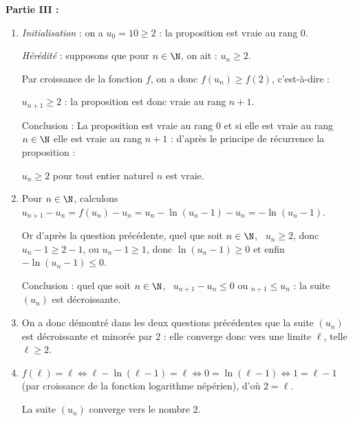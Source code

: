 \bigskip

\textbf{Partie III :}

\medskip

\begin{enumerate}
\item 
\emph{Initialisation} : on a $u_0 = 10 \geqslant 2$
 : la proposition est vraie au rang $0$.

\emph{Hérédité} : supposons que pour $n \in \N$, on ait : $u_n \geqslant 2$.

Par croissance de la fonction $f$, on a donc $f\left(u_n\right) \geqslant f(2)$, c'est-à-dire :

$u_{n+1} \geqslant 2$ : la proposition est donc vraie au rang $n + 1$.

Conclusion : La proposition est vraie au rang $0$ et si elle est vraie au rang $n \in \N$ elle est vraie au rang $n + 1$ : d'après le principe de récurrence la proposition :

\og $u_n \geqslant  2$ pour tout entier naturel $n$\fg{} est vraie.
 \item 
Pour $n \in \N$, calculons $u_{n+1} - u_n  = f\left(u_n \right) - u_n = u_n - \ln \left(u_n - 1 \right) - u_n = - \ln \left(u_n - 1 \right)$.

Or d'après la question précédente, quel que soit $n \in \N$, \, $u_n \geqslant 2$, donc $u_n - 1 \geqslant 2 - 1$, ou $u_n - 1 \geqslant 1$, donc $\ln \left(u_n - 1 \right) \geqslant 0$ et enfin $- \ln \left(u_n - 1 \right) \leqslant 0$.

Conclusion : quel que soit $n \in \N$, \, $u_{n+1} - u_n \leqslant 0$ ou $_{n+1} \leqslant u_n$ : la suite $\left(u_n\right)$ est décroissante.
\item 
On a donc démontré dans les deux questions précédentes que la suite $\left(u_n\right)$ est décroissante et minorée par 2 : elle converge donc vers une limite $\ell$, telle $\ell \geqslant 2$.
\item 
$f(\ell) = \ell \iff \ell - \ln (\ell - 1) = \ell \iff 0 = \ln (\ell- 1) \iff 1 = \ell - 1$ (par croissance de la fonction logarithme népérien), d'où $2 = \ell$.

La suite $\left(u_n\right)$ converge vers le nombre $2$.
\end{enumerate}
